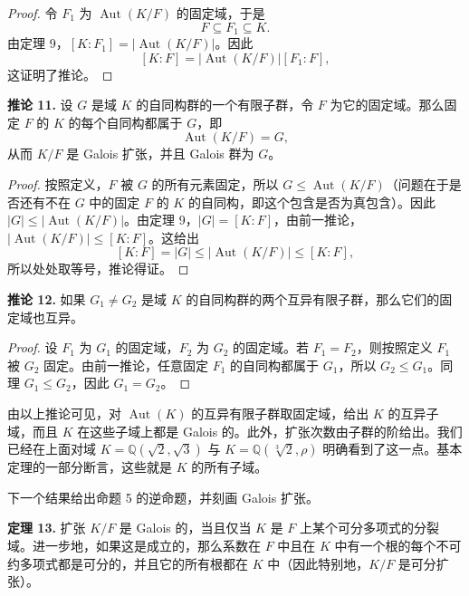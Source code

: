 \begin{proof}
令 $F_1$ 为 $\operatorname{Aut}(K/F)$ 的固定域，于是
\[
F\subseteq F_1\subseteq K.
\]
由定理 9，$[K:F_1]=|\operatorname{Aut}(K/F)|$。因此
\[
[K:F]=|\operatorname{Aut}(K/F)|[F_1:F],
\]
这证明了推论。
\end{proof}

\noindent\textbf{推论 11.} 设 $G$ 是域 $K$ 的自同构群的一个有限子群，令 $F$ 为它的固定域。那么固定 $F$ 的 $K$ 的每个自同构都属于 $G$，即
\[
\operatorname{Aut}(K/F)=G,
\]
从而 $K/F$ 是 Galois 扩张，并且 Galois 群为 $G$。

\begin{proof}
按照定义，$F$ 被 $G$ 的所有元素固定，所以 $G\leq\operatorname{Aut}(K/F)$（问题在于是否还有不在 $G$ 中的固定 $F$ 的 $K$ 的自同构，即这个包含是否为真包含）。因此 $|G|\leq|\operatorname{Aut}(K/F)|$。由定理 9，$|G|=[K:F]$，由前一推论，$|\operatorname{Aut}(K/F)|\leq [K:F]$。这给出
\[
[K:F]=|G|\leq |\operatorname{Aut}(K/F)|\leq [K:F],
\]
所以处处取等号，推论得证。
\end{proof}

\noindent\textbf{推论 12.} 如果 $G_1\neq G_2$ 是域 $K$ 的自同构群的两个互异有限子群，那么它们的固定域也互异。

\begin{proof}
设 $F_1$ 为 $G_1$ 的固定域，$F_2$ 为 $G_2$ 的固定域。若 $F_1=F_2$，则按照定义 $F_1$ 被 $G_2$ 固定。由前一推论，任意固定 $F_1$ 的自同构都属于 $G_1$，所以 $G_2\leq G_1$。同理 $G_1\leq G_2$，因此 $G_1=G_2$。
\end{proof}

由以上推论可见，对 $\operatorname{Aut}(K)$ 的互异有限子群取固定域，给出 $K$ 的互异子域，而且 $K$ 在这些子域上都是 Galois 的。此外，扩张次数由子群的阶给出。我们已经在上面对域 $K=\mathbb Q(\sqrt2,\sqrt3)$ 与 $K=\mathbb Q(\sqrt[3]{2},\rho)$ 明确看到了这一点。基本定理的一部分断言，这些就是 $K$ 的所有子域。

下一个结果给出命题 5 的逆命题，并刻画 Galois 扩张。

\noindent\textbf{定理 13.} 扩张 $K/F$ 是 Galois 的，当且仅当 $K$ 是 $F$ 上某个可分多项式的分裂域。进一步地，如果这是成立的，那么系数在 $F$ 中且在 $K$ 中有一个根的每个不可约多项式都是可分的，并且它的所有根都在 $K$ 中（因此特别地，$K/F$ 是可分扩张）。

